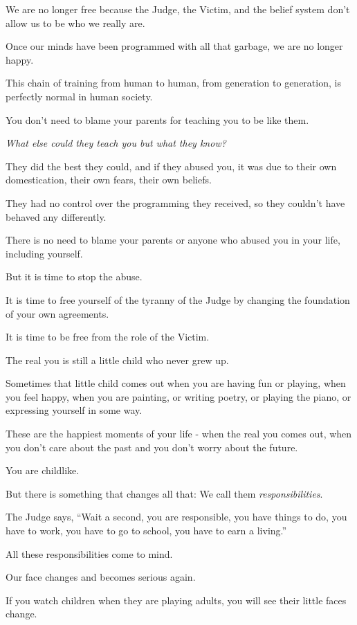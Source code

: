 \documentclass{article}
\numberwithin{equation}{section}
\begin{document}
We are no longer free because the Judge, the Victim, and the belief system don't allow us to be who we really are.

Once our minds have been programmed with all that garbage, we are no longer happy.

%
This chain of training from human to human, from generation to generation, is perfectly normal in human society.

You don't need to blame your parents for teaching you to be like them.

\textit{What else could they teach you but what they know?}

They did the best they could, and if they abused you, it was due to their own domestication, their own fears, their own beliefs.

They had no control over the programming they received, so they couldn't have behaved any differently.

%
There is no need to blame your parents or anyone who abused you in your life, including yourself.

But it is time to stop the abuse.

It is time to free yourself of the tyranny of the Judge by changing the foundation of your own agreements.

It is time to be free from the role of the Victim.

%
The real you is still a little child who never grew up.

Sometimes that little child comes out when you are having fun or playing, when you feel happy, when you are painting, or writing poetry, or playing the piano, or expressing yourself in some way.

These are the happiest moments of your life - when the real you comes out, when you don't care about the past and you don't worry about the future.

You are childlike.

%
But there is something that changes all that: We call them \textit{responsibilities}.

The Judge says, ``Wait a second, you are responsible, you have things to do, you have to work, you have to go to school, you have to earn a living.''

All these responsibilities come to mind.

Our face changes and becomes serious again.

If you watch children when they are playing adults, you will see their little faces change.
\end{document}

